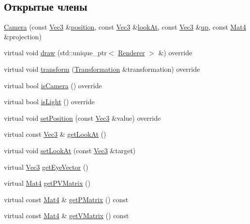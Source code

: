 \subsection*{Открытые члены}
\begin{DoxyCompactItemize}
\item 
\hyperlink{class_camera_a2f7d35911a4dcf218a0ef901cc0906dc}{Camera} (const \hyperlink{vec3_8h_a221ad8ea4d9be4111628ee1ca22ee3ba}{Vec3} \&\hyperlink{class_scene_object_af190cdf9b9449f96f73d836848ce4ad3}{position}, const \hyperlink{vec3_8h_a221ad8ea4d9be4111628ee1ca22ee3ba}{Vec3} \&\hyperlink{class_camera_a7aa44d09547fc7407002dc32b1891207}{look\+At}, const \hyperlink{vec3_8h_a221ad8ea4d9be4111628ee1ca22ee3ba}{Vec3} \&\hyperlink{class_camera_a4473532c8bbceefb503a5a7195044bfe}{up}, const \hyperlink{matrix_8h_a077dce9756976f552e5703c34475d5e3}{Mat4} \&projection)
\item 
virtual void \hyperlink{class_camera_a5c5155e999ea54c0385461de3ca0b95a}{draw} (std\+::unique\+\_\+ptr$<$ \hyperlink{class_renderer}{Renderer} $>$ \&) override
\item 
virtual void \hyperlink{class_camera_a76d8a9057211e4935405040d8fa154f6}{transform} (\hyperlink{class_transformation}{Transformation} \&transformation) override
\item 
virtual bool \hyperlink{class_camera_a629ebafac4f86f952dad42a0087c344c}{is\+Camera} () override
\item 
virtual bool \hyperlink{class_camera_a7209dc5149f4b8af2ed9e8b6297f6c41}{is\+Light} () override
\item 
virtual void \hyperlink{class_camera_a1ba2c3600a8a0f6e231ad9564bdb7359}{set\+Position} (const \hyperlink{vec3_8h_a221ad8ea4d9be4111628ee1ca22ee3ba}{Vec3} \&value) override
\item 
virtual const \hyperlink{vec3_8h_a221ad8ea4d9be4111628ee1ca22ee3ba}{Vec3} \& \hyperlink{class_camera_a318614134ed9e5182954daaceb17ca47}{get\+Look\+At} ()
\item 
virtual void \hyperlink{class_camera_abd0ac1ec8cc6c5ca79798fc61aa4a1fa}{set\+Look\+At} (const \hyperlink{vec3_8h_a221ad8ea4d9be4111628ee1ca22ee3ba}{Vec3} \&target)
\item 
virtual \hyperlink{vec3_8h_a221ad8ea4d9be4111628ee1ca22ee3ba}{Vec3} \hyperlink{class_camera_a49e96c7af94f85b1297fb4184c99fa28}{get\+Eye\+Vector} ()
\item 
virtual \hyperlink{matrix_8h_a077dce9756976f552e5703c34475d5e3}{Mat4} \hyperlink{class_camera_a081e90588c62b55623f22d0477082924}{get\+P\+V\+Matrix} ()
\item 
virtual const \hyperlink{matrix_8h_a077dce9756976f552e5703c34475d5e3}{Mat4} \& \hyperlink{class_camera_a0baac3a162f4e3507a5c35c97a2c4236}{get\+P\+Matrix} () const 
\item 
virtual const \hyperlink{matrix_8h_a077dce9756976f552e5703c34475d5e3}{Mat4} \& \hyperlink{class_camera_ac9ca414b8f610584b90486938131aa1e}{get\+V\+Matrix} () const 
\end{DoxyCompactItemize}
